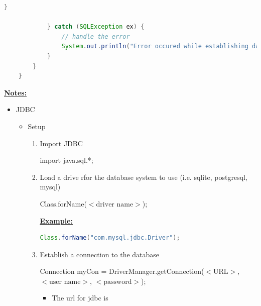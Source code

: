\documentclass[12pt]{article}
\begin{document}
\begin{enumerate}[1.]
\begin{enumerate}[a)]
\begin{lstlisting}[language=java]
            }

            } catch (SQLException ex) {
                // handle the error
                System.out.println("Error occured while establishing database connection");
            }
        }
    }
    \end{lstlisting}

        \bigskip

        \underline{\textbf{Notes:}}

        \bigskip

        \begin{itemize}
            \item JDBC
            \begin{itemize}
                \item Setup

                \bigskip

                \begin{enumerate}[1.]
                    \item Import JDBC

                    \bigskip

                    import java.sql.*;

                    \bigskip

                    \item Load a drive rfor the database system to use (i.e. sqlite, postgresql, mysql)

                    \bigskip

                    Class.forName($<\text{driver name}>$);

                    \bigskip

                    \underline{\textbf{Example:}}

                    \bigskip

    \begin{lstlisting}[language=JAVA]
    Class.forName("com.mysql.jdbc.Driver");
    \end{lstlisting}

                    \bigskip

                    \item Establish a connection to the database

                    \bigskip

                    Connection myCon = DriverManager.getConnection($<\text{URL}>$, $<\text{user name}>$, $<\text{password}>$);

                    \begin{itemize}
                        \item The url for jdbc is


\end{itemize}
\end{enumerate}
\end{itemize}
\end{itemize}
\end{enumerate}
\end{enumerate}
\end{document}
